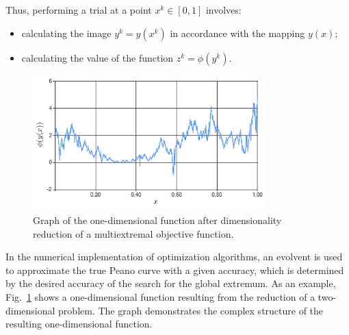 \documentclass[runningheads]{llncs}
\begin{document}
Thus, performing a trial at a point $x^k \in [0,1]$ involves:
\begin{itemize}
    \item calculating the image $y^k=y(x^k)$ in accordance with the mapping $y(x)$;
    \item calculating the value of the function $z^k=\phi(y^k)$.
\end{itemize}

%
%
%
%

\begin{figure}
\center
\includegraphics[width=0.8\textwidth]{fig1.png}
\caption{Graph of the one-dimensional function after dimensionality reduction of a multiextremal objective function.} \label{fig1}
\end{figure}

In the numerical implementation of optimization algorithms, an evolvent is used to approximate the true Peano curve with a given accuracy, which is determined by the desired accuracy of the search for the global extremum. As an example, Fig.~\ref{fig1} shows a one-dimensional function resulting from the reduction of a two-dimensional problem. The graph demonstrates the complex structure of the resulting one-dimensional function.
\end{document}

